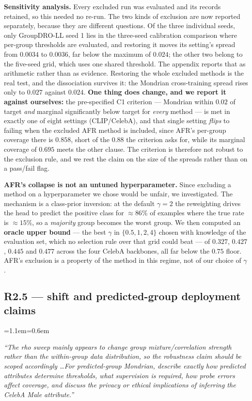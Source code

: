\documentclass[11pt,a4paper]{article}
\newenvironment{reviewer}
  {\begin{list}{}{\leftmargin=1.1em\rightmargin=0.6em}\item[]\itshape\color{revgrey}\small}
  {\end{list}}
\newcommand{\rpoint}[2]{\subsection*{#1 --- #2}}
\begin{document}
\textbf{Sensitivity analysis.} Every excluded run was evaluated and its records retained, so
this needed no re-run. The two kinds of exclusion are now reported separately, because they are
different questions. Of the three individual seeds, only GroupDRO-LL seed 1 lies in the three-seed
calibration comparison where per-group thresholds are evaluated, and restoring it moves its
setting's spread from $0.0034$ to $0.0036$, far below the maximum of $0.024$; the other two belong
to the five-seed grid, which uses one shared threshold. The
appendix reports that as arithmetic rather than as evidence. Restoring the whole excluded
methods is the real test, and the dissociation survives it: the Mondrian cross-training spread
rises only to $0.027$ against $0.024$. \textbf{One thing does change, and we report it against
ourselves:} the pre-specified C1 criterion --- Mondrian within $0.02$ of target \emph{and} marginal
significantly below target for \emph{every} method --- is met in exactly one of eight settings
(CLIP/CelebA), and that single setting \emph{flips} to failing when the excluded AFR method is
included, since AFR's per-group coverage there is $0.858$, short of the $0.88$ the criterion asks
for, while its marginal coverage of $0.695$ meets the other clause. The criterion is therefore not robust to
the exclusion rule, and we rest the claim on the size of the spreads rather than on a pass/fail
flag.

\textbf{AFR's collapse is not an untuned hyperparameter.} Since excluding a method on a
hyperparameter we chose would be unfair, we investigated. The mechanism is a class-prior inversion:
at the default $\gamma=2$ the reweighting drives the head to predict the positive class for
$\approx 86\%$ of examples where the true rate is $\approx 15\%$, so a \emph{majority} group becomes
the worst group. We then computed an \textbf{oracle upper bound} --- the best $\gamma$ in $\{0.5,1,2,4\}$ chosen
with knowledge of the evaluation set, which no selection rule over that grid could beat --- of
$0.327$, $0.427$, $0.445$ and $0.477$ across the four CelebA backbones, all far below the $0.75$
floor. AFR's exclusion is a
property of the method in this regime, not of our choice of $\gamma$.

\rpoint{R2.5}{shift and predicted-group deployment claims}

\begin{reviewer}
``The rho sweep mainly appears to change group mixture/correlation strength rather than the
within-group data distribution, so the robustness claim should be scoped accordingly \ldots For
predicted-group Mondrian, describe exactly how predicted attributes determine thresholds, what
supervision is required, how probe errors affect coverage, and discuss the privacy or ethical
implications of inferring the CelebA \emph{Male} attribute.''
\end{reviewer}
\end{document}
